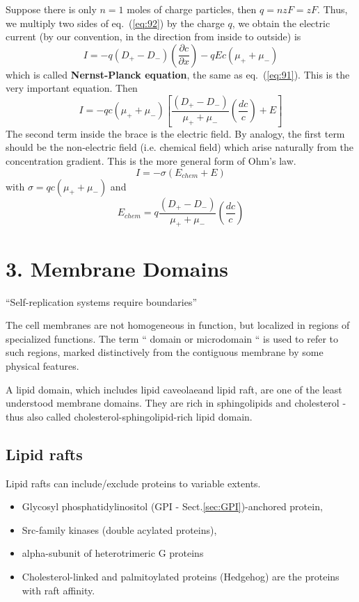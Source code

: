 Suppose there is only $n=1$ moles of charge particles, then
$q=nzF=zF$. Thus, we multiply two sides of eq.~(\ref{eq:92}) by the
charge $q$, we obtain the electric current (by our convention, in the
direction from inside to outside) is
\begin{equation}
  I = -q (D_+ - D_-) \left( \frac{\partial c}{\partial x}\right) - qEc(\mu_+ + \mu_-)
\end{equation}
which is called {\bf Nernst-Planck equation}, the same as
eq.~(\ref{eq:91}). This is the very important equation.  Then
\begin{equation}
  I =  -qc(\mu_+ + \mu_-)\left[ \frac{(D_+ - D_-)}{\mu_+ + \mu_-}
    \left( \frac{dc}{c}\right) + E \right]
\end{equation}
The second term inside the brace is the electric field. By analogy,
the first term should be the non-electric field (i.e. chemical field)
which arise naturally from the concentration gradient.  This is the more
general form of Ohm's law.
\begin{equation}
  I = -\sigma (E_{chem} + E)
\end{equation}
with $\sigma = qc(\mu_+ + \mu_-)$ and
\begin{equation}
  \label{eq:132}
  E_{chem} = q \frac{(D_+ - D_-)}{\mu_+ + \mu_-}
    \left( \frac{dc}{c}\right)
\end{equation}

\section{3. Membrane Domains}
\label{sec:membrane-domain}


``Self-replication systems require boundaries''

The cell membranes are not homogeneous in function, but localized in
regions of specialized functions.  The term `` domain or microdomain ``
is used to refer to such regions, marked distinctively from the
contiguous membrane by some physical features.

A lipid domain, which includes lipid caveolaeand lipid raft, are one of the
least understood membrane domains. They are rich in sphingolipids and
cholesterol  - thus also called cholesterol-sphingolipid-rich lipid domain.

\subsection{Lipid rafts}
\label{sec:lipid-rafts}


Lipid rafts can include/exclude proteins to variable extents. 
\begin{itemize}
\item	Glycosyl phosphatidylinositol (GPI - Sect.\ref{sec:GPI})-anchored protein,  
\item	Src-family kinases (double acylated proteins), 
\item	alpha-subunit of heterotrimeric G proteins 
\item	Cholesterol-linked and palmitoylated proteins (Hedgehog) 
  are the proteins with raft affinity.
\end{itemize}


